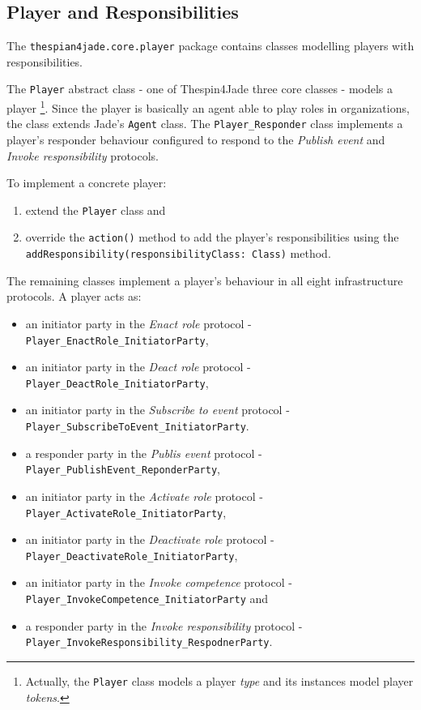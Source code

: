 \subsection{Player and Responsibilities}

The \texttt{thespian4jade.core.player} package contains classes modelling players with responsibilities.

The \texttt{Player} abstract class - one of Thespin4Jade three core classes - models a player
\footnote{Actually, the \texttt{Player} class models a player \textit{type} and its instances model player \textit{tokens}.}.
Since the player is basically an agent able to play roles in organizations, the class extends Jade's \texttt{Agent} class.
The \texttt{Player\_Responder} class implements a player's responder behaviour configured to respond to the \textit{Publish event} and \textit{Invoke responsibility} protocols.

To implement a concrete player:
\begin{enumerate}
	\item extend the \texttt{Player} class and
	\item override the \texttt{action()} method to add the player's responsibilities using the \texttt{addResponsibility(responsibilityClass: Class)} method.	
\end{enumerate}

The remaining classes implement a player's behaviour in all eight infrastructure protocols.
A player acts as:
\begin{itemize}
	\item an initiator party in the \textit{Enact role} protocol - \texttt{Player\_EnactRole\_InitiatorParty},
	\item an initiator party in the \textit{Deact role} protocol - \texttt{Player\_DeactRole\_InitiatorParty},
	\item an initiator party in the \textit{Subscribe to event} protocol - \texttt{Player\_SubscribeToEvent\_InitiatorParty}.
	\item a responder party in the \textit{Publis event} protocol - \texttt{Player\_PublishEvent\_ReponderParty},
	\item an initiator party in the \textit{Activate role} protocol - \texttt{Player\_ActivateRole\_InitiatorParty},
	\item an initiator party in the \textit{Deactivate role} protocol - \texttt{Player\_DeactivateRole\_InitiatorParty},
	\item an initiator party in the \textit{Invoke competence} protocol - \texttt{Player\_InvokeCompetence\_InitiatorParty} and
	\item a responder party in the \textit{Invoke responsibility} protocol - \texttt{Player\_InvokeResponsibility\_RespodnerParty}. 
\end{itemize}

